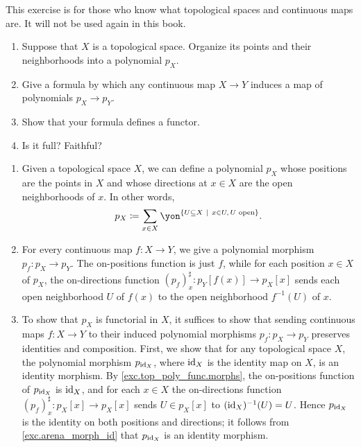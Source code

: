 \documentclass[Book-Poly]{subfiles}
\begin{document}

\begin{exercise} \label{exc.top_poly_func}
This exercise is for those who know what topological spaces and continuous maps are. It will not be used again in this book.
\begin{enumerate}
	\item Suppose that $X$ is a topological space. Organize its points and their neighborhoods into a polynomial $p_X$.
	\item Give a formula by which any continuous map $X\to Y$ induces a map of polynomials $p_X\to p_Y$.
	\item Show that your formula defines a functor.
	\item Is it full? Faithful?
\qedhere
\end{enumerate}
\begin{solution}
\begin{enumerate}
	\item Given a topological space $X$, we can define a polynomial $p_X$ whose positions are the points in $X$ and whose directions at $x \in X$ are the open neighborhoods of $x$.
	In other words,
	\[
	    p_X \coloneqq \sum_{x \in X} \yon^{\{ U \subseteq X \ | \ x \in U, \, U \text{ open} \}}.
	\]
	\item \label{exc.top_poly_func.morphs} For every continuous map $f \colon X \to Y$, we give a polynomial morphism $p_f \colon p_X \to p_Y$.
	The on-positions function is just $f$, while for each position $x \in X$ of $p_X$, the on-directions function $(p_f)^\sharp_x \colon p_Y[f(x)] \to p_X[x]$ sends each open neighborhood $U$ of $f(x)$ to the open neighborhood $f^{-1}(U)$ of $x$.
	
	\item To show that $p_X$ is functorial in $X$, it suffices to show that sending continuous maps $f \colon X \to Y$ to their induced polynomial morphisms $p_f \colon p_X \to p_Y$ preserves identities and composition.
	First, we show that for any topological space $X$, the polynomial morphism $p_{\mathrm{id}_X}$, where $\mathrm{id}_X$ is the identity map on $X$, is an identity morphism.
	By \cref{exc.top_poly_func.morphs}, the on-positions function of $p_{\mathrm{id}_X}$ is $\mathrm{id}_X$, and for each $x \in X$ the on-directions function $(p_f)^\sharp_x \colon p_X[x] \to p_X[x]$ sends $U \in p_X[x]$ to $(\mathrm{id}_X)^{-1}(U) = U$.
	Hence $p_{\mathrm{id}_X}$ is the identity on both positions and directions; it follows from \cref{exc.arena_morph_id} that $p_{\mathrm{id}_X}$ is an identity morphism.
	

\end{enumerate}
\end{solution}
\end{exercise}
\end{document}
